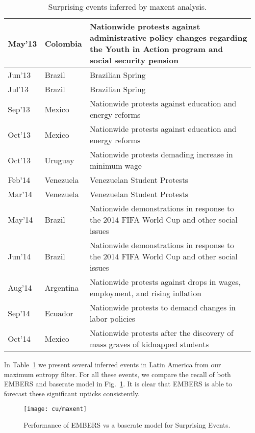 \begin{table}
\caption{Surprising events inferred by maxent analysis.}
\renewcommand{\arraystretch}{1.1}
\vspace{-3mm}
 \centering
 \begin{tabular}{|l|l|m{6cm}|}
 \hline
May'13  &  Colombia	 &  Nationwide protests against administrative policy changes regarding the
Youth in Action program and social security pension \\ \hline
Jun'13  &  Brazil  &  Brazilian Spring \\ \hline
Jul'13  &  Brazil  &  Brazilian Spring \\ \hline
Sep'13  &  Mexico  &  Nationwide protests against education and energy reforms \\ \hline
Oct'13  &  Mexico  &  Nationwide protests against education and energy reforms \\ \hline
Oct'13  &  Uruguay  &  Nationwide protests demading increase in minimum wage \\ \hline
Feb'14  &  Venezuela	  &  Venezuelan Student Protests \\ \hline
Mar'14  &  Venezuela  &  	Venezuelan Student Protests \\ \hline
May'14  &  Brazil  &  Nationwide demonstrations in response to the 2014 FIFA World Cup and other social issues \\ \hline
Jun'14  &  Brazil  &  Nationwide demonstrations in response to the 2014 FIFA World Cup and other social issues \\ \hline
Aug'14  &  Argentina	  &  Nationwide protests against drops in wages, employment, and rising inflation \\ \hline
Sep'14  &  Ecuador  &  Nationwide protests to demand changes in labor policies \\ \hline
Oct'14  &  Mexico  &  Nationwide protests after the discovery of mass graves of kidnapped students  \\ \hline
\end{tabular}
\vspace{-5mm}
\label{tab:maxentEvents}
\end{table}

In Table~\ref{tab:maxentEvents} we present several inferred events in Latin America from our maximum entropy
filter.
For all these events, we compare the recall of both EMBERS and baserate model in Fig.~\ref{fig:maxent}. 
It is clear that EMBERS is able to forecast these significant upticks consistently.

\begin{figure}[H]
\centering
\texttt{[image: cu/maxent]}
\caption{Performance of EMBERS vs a baserate model for Surprising Events.}
\label{fig:maxent}
\end{figure}
